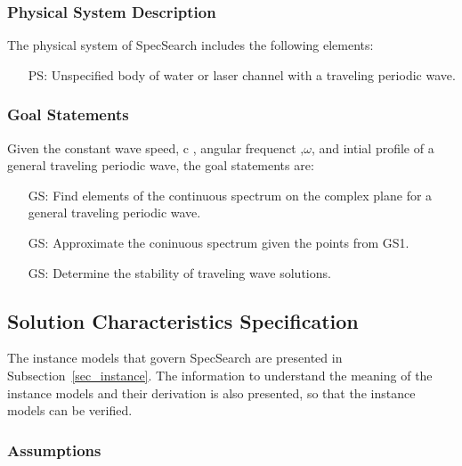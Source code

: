 \documentclass[12pt]{article}
\newcounter{goalnum} %
\begin{document}
\subsubsection{Physical System Description}

The physical system of SpecSearch includes the following elements:

\begin{itemize}

\item[PS\refstepcounter{goalnum}\thegoalnum \label{G_meaningfulLabel}:] 
Unspecified body of water or laser channel with a traveling periodic 
wave.

\end{itemize}

\subsubsection{Goal Statements}
\noindent Given the constant wave speed, c , angular frequenct ,$\omega$, and 
intial profile of a general traveling periodic wave, the goal statements are:

\begin{itemize}

\item[GS\refstepcounter{goalnum}\thegoalnum \label{G_meaningfulLabel}:] 
Find elements of the continuous spectrum on the complex plane for a general 
traveling periodic wave. 
\item[GS\refstepcounter{goalnum}\thegoalnum \label{G_meaningfulLabel}:] 
Approximate the coninuous spectrum given the points from GS1.
\item[GS\refstepcounter{goalnum}\thegoalnum \label{G_meaningfulLabel}:] 
Determine the stability of traveling wave solutions.

\end{itemize}

\subsection{Solution Characteristics Specification}

The instance models that govern SpecSearch are presented in
Subsection~\ref{sec_instance}.  The information to understand the meaning of the
instance models and their derivation is also presented, so that the instance
models can be verified.

\subsubsection{Assumptions}
\end{document}
